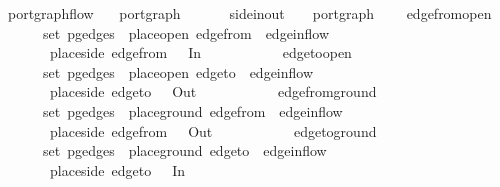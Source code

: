 \isamarkupfalse%
\ port{\isacharunderscore}graph{\isacharunderscore}flow\ {\isacharequal}\isanewline
\ \ port{\isacharunderscore}graph\ \ \ \ {\isacharcolon}{\isacharcolon}\ {\isachardoublequoteopen}{\isacharparenleft}\ {\isacharcolon}{\isacharcolon}\ side{\isacharunderscore}in{\isacharunderscore}out{\isacharcomma}\ \ \ \ port{\isacharunderscore}graph{\isachardoublequoteclose}\ {\isacharplus}\isanewline
\ \ \ edge{\isacharunderscore}from{\isacharunderscore}open{\isacharcolon}\isanewline
\ \ \ \ {\isachardoublequoteopen}{\isasymlbrakk}\ {\isasymin}\ set\ {\isacharparenleft}pg{\isacharunderscore}edges\ \ place{\isacharunderscore}open\ {\isacharparenleft}edge{\isacharunderscore}from\ \ edge{\isacharunderscore}in{\isacharunderscore}flow\ \isanewline
\ \ \ \ \ \ {\isasymLongrightarrow}\ place{\isacharunderscore}side\ {\isacharparenleft}edge{\isacharunderscore}from\ \ {\isacharequal}\ In{\isachardoublequoteclose}\isanewline
\ \ \ \ \ \ \ \ \ \ \ edge{\isacharunderscore}to{\isacharunderscore}open{\isacharcolon}\isanewline
\ \ \ \ {\isachardoublequoteopen}{\isasymlbrakk}\ {\isasymin}\ set\ {\isacharparenleft}pg{\isacharunderscore}edges\ \ place{\isacharunderscore}open\ {\isacharparenleft}edge{\isacharunderscore}to\ \ edge{\isacharunderscore}in{\isacharunderscore}flow\ \isanewline
\ \ \ \ \ \ {\isasymLongrightarrow}\ place{\isacharunderscore}side\ {\isacharparenleft}edge{\isacharunderscore}to\ \ {\isacharequal}\ Out{\isachardoublequoteclose}\isanewline
\ \ \ \ \ \ \ \ \ \ \ edge{\isacharunderscore}from{\isacharunderscore}ground{\isacharcolon}\isanewline
\ \ \ \ {\isachardoublequoteopen}{\isasymlbrakk}\ {\isasymin}\ set\ {\isacharparenleft}pg{\isacharunderscore}edges\ \ place{\isacharunderscore}ground\ {\isacharparenleft}edge{\isacharunderscore}from\ \ edge{\isacharunderscore}in{\isacharunderscore}flow\ \isanewline
\ \ \ \ \ \ {\isasymLongrightarrow}\ place{\isacharunderscore}side\ {\isacharparenleft}edge{\isacharunderscore}from\ \ {\isacharequal}\ Out{\isachardoublequoteclose}\isanewline
\ \ \ \ \ \ \ \ \ \ \ edge{\isacharunderscore}to{\isacharunderscore}ground{\isacharcolon}\isanewline
\ \ \ \ {\isachardoublequoteopen}{\isasymlbrakk}\ {\isasymin}\ set\ {\isacharparenleft}pg{\isacharunderscore}edges\ \ place{\isacharunderscore}ground\ {\isacharparenleft}edge{\isacharunderscore}to\ \ edge{\isacharunderscore}in{\isacharunderscore}flow\ \isanewline
\ \ \ \ \ \ {\isasymLongrightarrow}\ place{\isacharunderscore}side\ {\isacharparenleft}edge{\isacharunderscore}to\ \ {\isacharequal}\ In{\isachardoublequoteclose}

